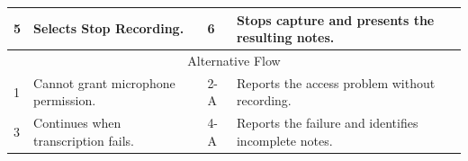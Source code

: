 \begin{table}[htbp]
\begin{tabular}{|p{}|p{}|p{}|p{}|p{}|}
5 & \multicolumn{2}{p{\dimexpr0.37\textwidth+2\tabcolsep+\arrayrulewidth\relax}|}{Selects Stop Recording.} & 6 & Stops capture and presents the resulting notes. \\ \hline
\multicolumn{5}{|c|}{Alternative Flow} \\ \hline
1 & \multicolumn{2}{p{\dimexpr0.37\textwidth+2\tabcolsep+\arrayrulewidth\relax}|}{Cannot grant microphone permission.} & 2-A & Reports the access problem without recording. \\ \hline
3 & \multicolumn{2}{p{\dimexpr0.37\textwidth+2\tabcolsep+\arrayrulewidth\relax}|}{Continues when transcription fails.} & 4-A & Reports the failure and identifies incomplete notes. \\ \hline
\end{tabular}
\end{table}

